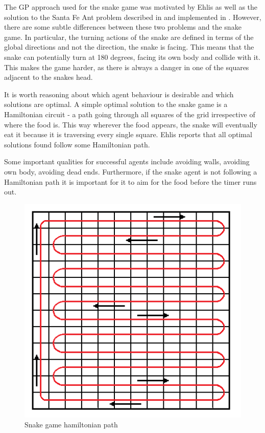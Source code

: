 \documentclass[12pt,a4paper]{article}
\begin{document}
	The GP approach used for the snake game was motivated by Ehlis \cite{ehlis_application_2000} as well as the solution to the Santa Fe Ant problem described in \cite{koza_genetic_1992} and implemented in \cite{noauthor_artificial_nodate}. However, there are some subtle differences between these two problems and the snake game. In particular, the turning actions of the snake are defined in terms of the global directions and not the direction, the snake is facing. This means that the snake can potentially turn at 180 degrees, facing its own body and collide with it. This makes the game harder, as there is always a danger in one of the squares adjacent to the snakes head. 
	
	It is worth reasoning about which agent behaviour is desirable and which solutions are optimal. A simple optimal solution to the snake game is a Hamiltonian circuit \cite{noauthor_hamiltonian_2017} - a path going through all squares of the grid irrespective of where the food is. This way wherever the food appears, the snake will eventually eat it because it is traversing every single square. Ehlis \cite{ehlis_application_2000} reports that all optimal solutions found follow some Hamiltonian path.
	
	Some important qualities for successful agents include avoiding walls, avoiding own body, avoiding dead ends. Furthermore, if the snake agent is not following a Hamiltonian path it is important for it to aim for the food before the timer runs out.
	
	\begin{figure}[h!]
		\centering
		\includegraphics[width=0.7\linewidth]{figures/hamiltonian}
		\caption{Snake game hamiltonian path}
		\label{fig:ham_path}
	\end{figure}
	
\end{document}
